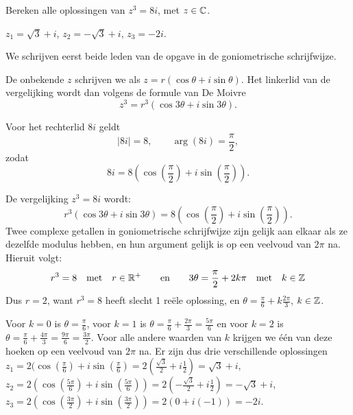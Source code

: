 \documentclass{ximera}
\begin{document}
\begin{exercise} 
	\begin{statement}
		Bereken alle oplossingen van $z^3=8i$, met $z\in \mathbb{C}$.
		\end{statement}
	\begin{uitkomst}
		$ z_1 = \sqrt 3 + i$,
		$	z_2 = -\sqrt 3 +i $,
		$	z_3 = -2i $.
		
	\end{uitkomst}
	\begin{oplossing}
		We schrijven eerst beide leden van de opgave in de goniometrische schrijfwijze.
		
		De onbekende $z$ schrijven we als $z = r(\cos\theta+i\sin\theta)$. Het linkerlid van de vergelijking wordt dan volgens de formule van De Moivre $$z^3 = r^3 (\cos 3\theta+i\sin 3\theta).$$
		
		Voor het rechterlid $8i$ geldt
		\[ |8i| = 8, \qquad \arg (8i) =  \frac{\pi}{2}, \]
		zodat
		\[ 8i = 8( \cos(\frac{\pi}{2}) + i \sin(\frac{\pi}{2})). \]
		
		De
		vergelijking $z^3=8i$ wordt:
		$$r^3 (\cos 3\theta+i\sin 3\theta) = 8( \cos(\frac{\pi}{2}) + i \sin(\frac{\pi}{2})).$$
		Twee complexe getallen in goniometrische schrijfwijze zijn gelijk aan elkaar als ze dezelfde modulus hebben, en hun argument gelijk is op een veelvoud van $2 \pi$ na.
		Hieruit volgt:
		\[ r^3 = 8 \quad \text{met} \quad r\in \mathbb{R}^+ \qquad \text{en} \qquad 3 \theta =  \frac{\pi}{2} + 2 k \pi \quad \text{met} \quad k\in \mathbb{Z}\]
		Dus $r= 2$, want $r^3=8$ heeft slecht 1 reële oplossing, en $\theta =  \frac{\pi}{6} + k \frac{2\pi}{3}$, $k \in \mathbb{Z}$. 
		
		Voor $k=0$ is
		$\theta =  \frac{\pi}{6}$, voor $k=1$ is $\theta = 
		\frac{\pi}{6} + \frac{2\pi}{3} = \frac{5\pi}{6}$ en voor $k=2$ is $\theta = 
		\frac{\pi}{6} + \frac{4\pi}{3} = \frac{9\pi}{6} = \frac{3\pi}{2}$. Voor alle andere waarden van $k$ krijgen we één van deze hoeken op een veelvoud van $2 \pi$ na. Er zijn dus drie verschillende oplossingen 
		\\$ z_1 = 2( \cos(\frac{\pi}{6}) + i \sin(\frac{\pi}{6}) = 2(\frac{\sqrt3}{2} + i \frac12)= \sqrt 3 + i$,
		\\$	z_2 = 2( \cos(\frac{5\pi}{6}) + i \sin(\frac{5\pi}{6})) =2(- \frac{\sqrt3}{2} + i \frac12)=-\sqrt 3 +i $,
		\\$	z_3 = 2( \cos(\frac{3\pi}{2}) + i \sin(\frac{3\pi}{2})) =2(0 + i (-1))=-2i $.
	\end{oplossing}
\end{exercise}
\end{document}
